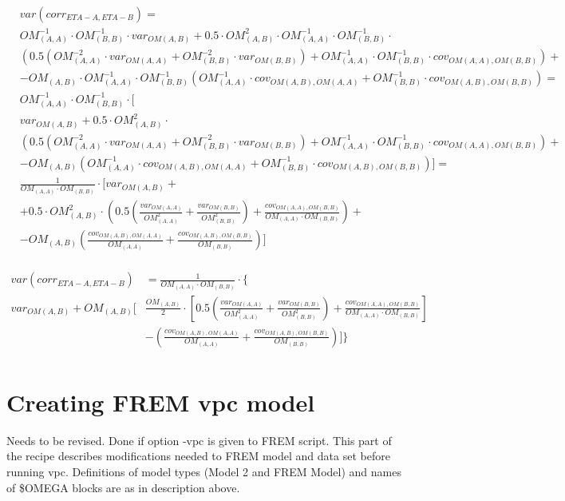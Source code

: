 \[
\begin{split}
&var\left(corr_{ETA-A,ETA-B}\right)=\\
& OM_{(A,A)}^{-1} \cdot OM_{(B,B)}^{-1}\cdot var_{OM(A,B)}+0.5 \cdot OM_{(A,B)}^2\cdot OM_{(A,A)}^{-1} \cdot OM_{(B,B)}^{-1}\cdot \\
&\left(0.5 \left ( OM_{(A,A)}^{-2}\cdot var_{OM(A,A)}+OM_{(B,B)}^{-2}\cdot var_{OM(B,B)}    \right) +  OM_{(A,A)}^{-1} \cdot OM_{(B,B)}^{-1}\cdot cov_{OM(A,A),OM(B,B)} \right)+\\
& - OM_{(A,B)} \cdot OM_{(A,A)}^{-1} \cdot OM_{(B,B)}^{-1}\left(OM_{(A,A)}^{-1} \cdot cov_{OM(A,B),OM(A,A)}+OM_{(B,B)}^{-1}\cdot cov_{OM(A,B),OM(B,B)} \right) =\\
& OM_{(A,A)}^{-1} \cdot OM_{(B,B)}^{-1}\cdot [ \\
& var_{OM(A,B)}+0.5 \cdot OM_{(A,B)}^2\cdot \\
&\left(0.5 \left ( OM_{(A,A)}^{-2}\cdot var_{OM(A,A)}+OM_{(B,B)}^{-2}\cdot var_{OM(B,B)}    \right) +  OM_{(A,A)}^{-1} \cdot OM_{(B,B)}^{-1}\cdot cov_{OM(A,A),OM(B,B)} \right)+\\
& - OM_{(A,B)} \left(OM_{(A,A)}^{-1} \cdot cov_{OM(A,B),OM(A,A)}+OM_{(B,B)}^{-1}\cdot cov_{OM(A,B),OM(B,B)} \right) ]=\\
& \frac{1}{OM_{(A,A)}\cdot OM_{(B,B)}}\cdot [ var_{OM(A,B)} +\\
& +0.5 \cdot OM_{(A,B)}^2\cdot
\left(0.5 \left ( \frac{var_{OM(A,A)}}{OM_{(A,A)}^{2}}  +\frac{var_{OM(B,B)}}{OM_{(B,B)}^{2}}    \right) +  \frac{cov_{OM(A,A),OM(B,B)}}{OM_{(A,A)} \cdot OM_{(B,B)}} \right)+\\
& - OM_{(A,B)} \left(\frac{cov_{OM(A,B),OM(A,A)}}{OM_{(A,A)}}+ \frac{cov_{OM(A,B),OM(B,B)}}{OM_{(B,B)}} \right) ]\\
\end{split}
\]

\[
\begin{split}
var\left(corr_{ETA-A,ETA-B}\right)&=\frac{1}{OM_{(A,A)}\cdot OM_{(B,B)}}\cdot \{\\
 var_{OM(A,B)} + OM_{(A,B)} [ & \frac{OM_{(A,B)}}{2}\cdot
\left[0.5 \left ( \frac{var_{OM(A,A)}}{OM_{(A,A)}^{2}}  +\frac{var_{OM(B,B)}}{OM_{(B,B)}^{2}}    \right) +  \frac{cov_{OM(A,A),OM(B,B)}}{OM_{(A,A)} \cdot OM_{(B,B)}} \right]\\
& - \left(\frac{cov_{OM(A,B),OM(A,A)}}{OM_{(A,A)}}+ \frac{cov_{OM(A,B),OM(B,B)}}{OM_{(B,B)}} \right)]\}\\
\end{split}
\]


\section{Creating FREM vpc model}
Needs to be revised.
Done if option -vpc is given to FREM script. This part of the recipe describes modifications needed to FREM model and data set before running vpc. Definitions of model types (Model 2 and FREM Model) and names of \$OMEGA blocks are as in description above.

